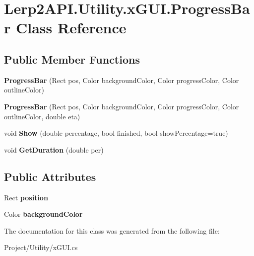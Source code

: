 \hypertarget{class_lerp2_a_p_i_1_1_utility_1_1x_g_u_i_1_1_progress_bar}{}\section{Lerp2\+A\+P\+I.\+Utility.\+x\+G\+U\+I.\+Progress\+Bar Class Reference}
\label{class_lerp2_a_p_i_1_1_utility_1_1x_g_u_i_1_1_progress_bar}
\subsection*{Public Member Functions}
\begin{DoxyCompactItemize}
\item 
\mbox{\label{class_lerp2_a_p_i_1_1_utility_1_1x_g_u_i_1_1_progress_bar_a9333d50d1421df81e926ece7820b9992}} 
{\bfseries Progress\+Bar} (Rect pos, Color background\+Color, Color progress\+Color, Color outline\+Color)
\item 
\mbox{\label{class_lerp2_a_p_i_1_1_utility_1_1x_g_u_i_1_1_progress_bar_a1ab39a00d6557a35dbc0581324ab2193}} 
{\bfseries Progress\+Bar} (Rect pos, Color background\+Color, Color progress\+Color, Color outline\+Color, double eta)
\item 
\mbox{\label{class_lerp2_a_p_i_1_1_utility_1_1x_g_u_i_1_1_progress_bar_a01ef3446be2bc183a5a0039588b21a9f}} 
void {\bfseries Show} (double percentage, bool finished, bool show\+Percentage=true)
\item 
\mbox{\label{class_lerp2_a_p_i_1_1_utility_1_1x_g_u_i_1_1_progress_bar_a971cda756147f0b4233febf2648ea967}} 
void {\bfseries Get\+Duration} (double per)
\end{DoxyCompactItemize}
\subsection*{Public Attributes}
\begin{DoxyCompactItemize}
\item 
\mbox{\label{class_lerp2_a_p_i_1_1_utility_1_1x_g_u_i_1_1_progress_bar_aa5f866590507139c90f4a87486d4912c}} 
Rect {\bfseries position}
\item 
\mbox{\label{class_lerp2_a_p_i_1_1_utility_1_1x_g_u_i_1_1_progress_bar_a8c9f8f47d4ad863cb7811cfe59387bab}} 
Color {\bfseries background\+Color}
\end{DoxyCompactItemize}


The documentation for this class was generated from the following file\+:\begin{DoxyCompactItemize}
\item 
Project/\+Utility/x\+G\+U\+I.\+cs\end{DoxyCompactItemize}
